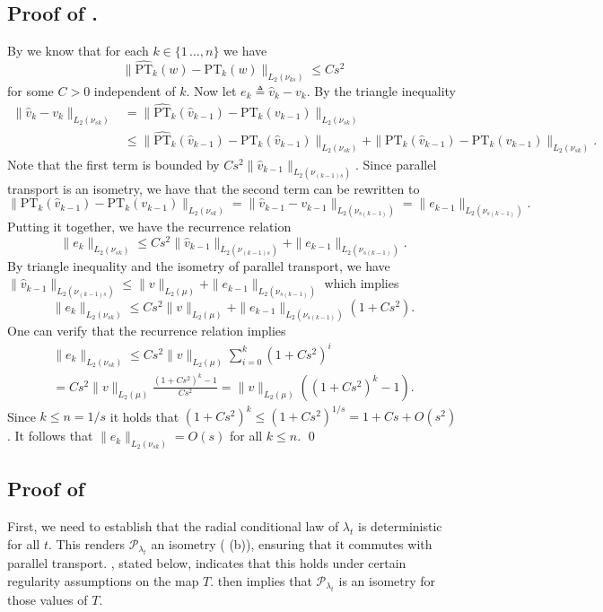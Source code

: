 \documentclass[11pt]{article}
\begin{document}
\subsection{Proof of .} \label{sec: proof of full approximation of parallel transport along regular curves}
By  we know that for each $k \in \{1\, \dots , n\}$ we have \[\|\widehat{\text{PT}}_k(w) - \text{PT}_k(w)\|_{L_2(\nu_{ks})} \leq Cs^2\]
for some $C > 0$ independent of $k$. Now let $e_k \triangleq \hat v_k - v_k.$ By the triangle inequality
\begin{align*}
    \|\hat v_k - v_k\|_{L_2(\nu_{sk})}  &= \|\widehat{\text{PT}}_k(\hat v_{k-1}) - \text{PT}_k(v_{k-1})\|_{L_2(\nu_{sk})}\\ &\leq \|\widehat{\text{PT}}_k(\hat v_{k-1}) - \text{PT}_k(\hat v_{k-1})\|_{L_2(\nu_{sk})} + \|\text{PT}_k(\hat v_{k-1}) - \text{PT}_k(v_{k-1})\|_{L_2(\nu_{sk})}.
\end{align*}
Note that the first term is bounded by $Cs^2\|\hat v_{k - 1}\|_{L_2(\nu_{(k-1)s})}$. Since parallel transport is an isometry, we have that the second term can be rewritten to
\[\|\text{PT}_k(\hat v_{k-1}) - \text{PT}_k(v_{k-1})\|_{L_2(\nu_{sk})} = \|\hat v_{k-1} - v_{k-1}\|_{L_2(\nu_{s(k-1)})} = \|e_{k-1}\|_{L_2(\nu_{s(k-1)})}.\]
Putting it together, we have the recurrence relation 
\[\|e_k\|_{L_2(\nu_{sk})} \leq Cs^2\|\hat v_{k - 1}\|_{L_2(\nu_{(k-1)s})} + \|e_{k-1}\|_{L_2(\nu_{s(k-1)})}.\]
By triangle inequality and the isometry of parallel transport, we have $\|\hat v_{k-1}\|_{L_2(\nu_{(k-1)s})} \leq \|v\|_{L_2(\mu)} + \|e_{k-1}\|_{L_2(\nu_{s(k-1)})}$ which implies 
\[\|e_k\|_{L_2(\nu_{sk})} \leq Cs^2\|v\|_{L_2(\mu)} + \|e_{k-1}\|_{L_2(\nu_{s(k-1)})}\left( 1 + Cs^2\right).\]
One can verify that the recurrence relation implies
\begin{multline} \label{eq: error recursion}
\|e_k\|_{L_2(\nu_{sk})} \leq Cs^2\|v\|_{L_2(\mu)}\sum_{i = 0}^k(1 + Cs^2)^i\\ = Cs^2\|v\|_{L_2(\mu)} \frac{(1 + Cs^2)^{k} - 1}{Cs^2} = \|v\|_{L_2(\mu)}\left((1 + Cs^2)^{k} - 1\right).\end{multline}
Since $k \leq n = 1/s$ it holds that $(1 + Cs^2)^k \leq (1 + Cs^2)^{1/s}  = 1 + Cs + O(s^2)$. It follows that $\|e_k\|_{L_2(\nu_{sk})} = O(s)$
for all $k \leq n$. 
\qed{}

\subsection{Proof of } \label{sec: proof of commutator}
First, we need to establish that the radial conditional law of $\lambda_t$ is deterministic for all $t$. This renders $\mathcal{P}_{\lambda_t}$ an isometry ( (b)), ensuring that it commutes with parallel transport. , stated below, indicates that this holds under certain regularity assumptions on the map $T$.  then implies that $\mathcal{P}_{\lambda_t}$ is an isometry for those values of $T$. 
\end{document}
